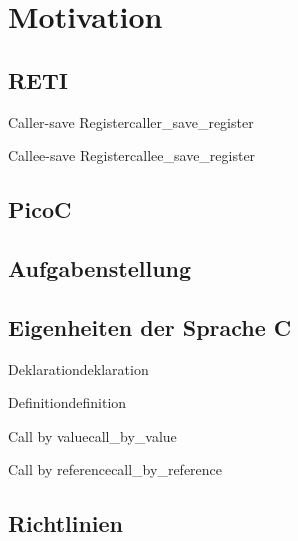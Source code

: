 
\chapter{Motivation}
\label{ch:motivation}

\section{RETI}
\begin{Definition}{Caller-save Register}{caller_save_register}
\end{Definition}

\begin{Definition}{Callee-save Register}{callee_save_register}
\end{Definition}

\section{PicoC}
\section{Aufgabenstellung}
\section{Eigenheiten der Sprache C}

\begin{Definition}{Deklaration}{deklaration}
\end{Definition}

\begin{Definition}{Definition}{definition}
\end{Definition}

\begin{Definition}{Call by value}{call_by_value}
\end{Definition}

\begin{Definition}{Call by reference}{call_by_reference}
\end{Definition}


\section{Richtlinien}
